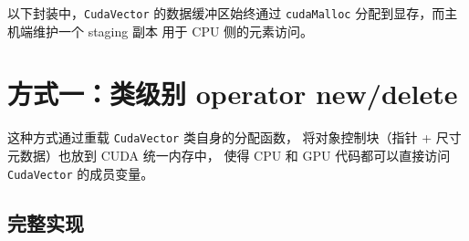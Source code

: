 \documentclass[12pt,a4paper,fontset=fandol]{ctexbook}
\begin{document}
以下封装中，\texttt{CudaVector} 的数据缓冲区始终通过
\texttt{cudaMalloc} 分配到显存，而主机端维护一个 staging 副本
用于 CPU 侧的元素访问。

\section{方式一：类级别 operator new/delete}

这种方式通过重载 \texttt{CudaVector} 类自身的分配函数，
将对象控制块（指针 + 尺寸元数据）也放到 CUDA 统一内存中，
使得 CPU 和 GPU 代码都可以直接访问 \texttt{CudaVector} 的成员变量。

\subsection{完整实现}
\end{document}
